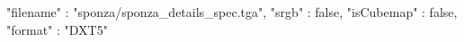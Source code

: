 { 
	"filename" : "sponza/sponza_details_spec.tga", 
	"srgb" : false,
	"isCubemap" : false,
	"format" : "DXT5"
}